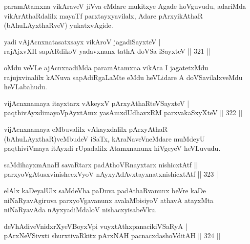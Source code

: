 \begin{artha}
paramAtamxna vikAraveV jiVva eMdare mukitxye Agade hoVguvudu, adariMda vikArAthaRdalilx mayaTf parxtayxyavilalx, Adare pArxyikAthaR (bAhuLAyxthaRveV) yukatxvAgide.
\end{artha}

\begin{shl}
yadi vA\s jAcnxnatasatxsayx vikAroV jagadiSayxteV | \\
rajAjxvXH sapARdikoV yadavxnanx tathA doVSa iSayxteV \hfill||  321 ||  
\end{shl}

\begin{artha}
oMdu veVLe ajAcnxnadiMda paramAtamxna vikAra I jagatetxMdu rajujxvinalilx kANuva sapAdiRgaLaMte eMdu heVLidare A doVSavilalxveMdu heVLabahudu.
\end{artha}


\begin{shl}
vijAcnxnamaya itayxtarx vAkeyxV pArxyAthaRteVSayxteV | \\
paqthivAyxdimayoV\s pAyxtAmx yasAmxdUdhavxRM parxvakaSxyXteV \hfill||  322 ||  
\end{shl}

\begin{artha}
vijAcnxnamaya eMbuvalilx vAkayxdalilx pArxyAthaR (bAhuLAyxthaR)veMbudeV iSaTx, kAraNaveVneMdare muMdeyU paqthiviVmaya itAyxdi rUpadalilx Atamxnanunx hiVgeyeV heVLuvudu.
\end{artha}

\begin{shl}
saMdihayxmAnaH savaRtarx padAthoVR\s nayxtarx nishicxtAtf ||  \\
parxyoVgAtusxvinishecxVyoV nAyxyAdAvx\s tayxnatxnishicxtAtf \hfill||  323 ||  
\end{shl}

\begin{artha}
elAlx kaDeyalUlx saMdeVha paDuva padAthaRvanunx beVre kaDe niNaRyavAgiruva parxyoVgavanunx avalaMbisiyoV athavA atayxMta niNaRyavAda nAyxyadiMdaloV nishacxyisabeVku.
\end{artha}


\begin{shl}
deVhAdiveVnidxrXyeVBoyxV\s pi vuyxtAthxpanacikiVSaRyA | \\
pArxNeVSivxti shurxtivaRkitx pArxNAH pacnacxdashoVditAH \hfill||  324 ||  
\end{shl}

